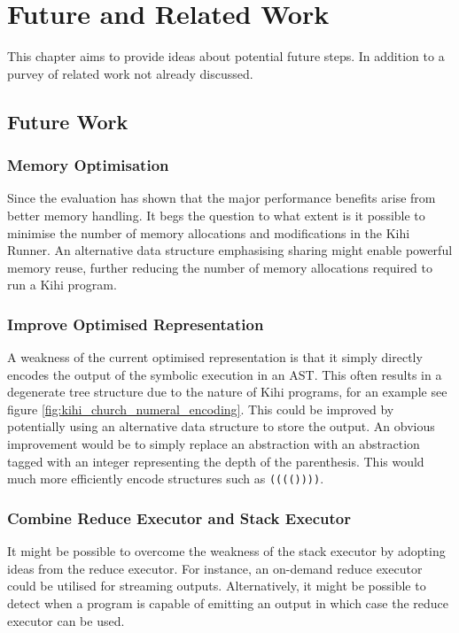 \chapter{Future and Related Work} \label{C:work} 
This chapter aims to provide ideas about potential future steps. In addition to a purvey of related work not already discussed.

\section{Future Work}
\subsection{Memory Optimisation}
Since the evaluation has shown that the major performance benefits arise from better memory handling. It begs the question to what extent is it possible to minimise the number of memory allocations and modifications in the Kihi Runner. An alternative data structure emphasising sharing might enable powerful memory reuse, further reducing the number of memory allocations required to run a Kihi program.

\subsection{Improve Optimised Representation}
A weakness of the current optimised representation is that it simply directly encodes the output of the symbolic execution in an AST. This often results in a degenerate tree structure due to the nature of Kihi programs, for an example see figure \ref{fig:kihi_church_numeral_encoding}. This could be improved by potentially using an alternative data structure to store the output. An obvious improvement would be to simply replace an abstraction with an abstraction tagged with an integer representing the depth of the parenthesis. This would much more efficiently encode structures such as \lstinline{(((())))}.

\subsection{Combine Reduce Executor and Stack Executor}
It might be possible to overcome the weakness of the stack executor by adopting ideas from the reduce executor. For instance, an on-demand reduce executor could be utilised for streaming outputs. Alternatively, it might be possible to detect when a program is capable of emitting an output in which case the reduce executor can be used.

